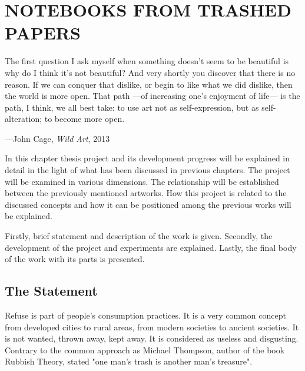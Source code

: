 \chapter{NOTEBOOKS FROM TRASHED PAPERS}




\begin{singlespace}
\epigraph{The first question I ask myself when something doesn't seem to be beautiful is why do I think it's not beautiful? And very shortly you discover that there is no reason. If we can conquer that dislike, or begin to like what we did dislike, then the world is more open. That path ---of increasing one's enjoyment of life--- is the path, I think, we all best take: to use art not as self-expression, but as self-alteration; to become more open.}{\hfill---John Cage, \textit{Wild Art}, 2013}
\end{singlespace}





In this chapter thesis project and its development progress will be explained in detail in the light of what has been discussed in previous chapters. The project will be examined in various dimensions. The relationship will be established between the previously mentioned artworks. How this project is related to the discussed concepts and how it can be positioned among the previous works will be explained.

Firstly, brief statement and description of the work is given. Secondly, the development of the project and experiments are explained. Lastly, the final body of the work with its parts is presented.





%
%
\section{The Statement}
Refuse is part of people’s consumption practices. It is a very common concept from developed cities to rural areas, from modern societies to ancient societies. It is not wanted, thrown away, kept away. It is considered as useless and disgusting. Contrary to the common approach as Michael Thompson, author of the book Rubbish Theory, stated "one man's trash is another man's treasure".

